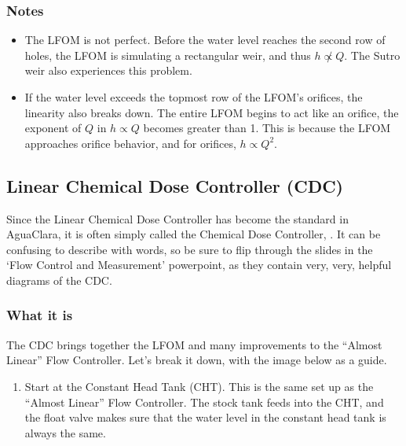 \documentclass[letterpaper,10pt,english]{sphinxmanual}
\begin{document}
\subsubsection{Notes}
\label{\detokenize{Flow_Control_and_Measurement/FCM_Design:id4}}\begin{itemize}
\item {} 
The LFOM is not perfect. Before the water level reaches the second row of holes, the LFOM is simulating a rectangular weir, and thus \(h \not\propto Q\). The Sutro weir also experiences this problem.

\item {} 
If the water level exceeds the topmost row of the LFOM’s orifices, the linearity also breaks down. The entire LFOM begins to act like an orifice, the exponent of \(Q\) in \(h \propto Q\) becomes greater than 1. This is because the LFOM approaches orifice behavior, and for orifices, \(h \propto Q^2\).

\end{itemize}


\subsection{Linear Chemical Dose Controller (CDC)}
\label{\detokenize{Flow_Control_and_Measurement/FCM_Design:linear-chemical-dose-controller-cdc}}\label{\detokenize{Flow_Control_and_Measurement/FCM_Design:heading-linear-cdc}}
Since the Linear Chemical Dose Controller has become the standard in AguaClara, it is often simply called the Chemical Dose Controller, . It can be confusing to describe with words, so be sure to flip through the slides in the ‘Flow Control and Measurement’ powerpoint, as they contain very, very, helpful diagrams of the CDC.


\subsubsection{What it is}
\label{\detokenize{Flow_Control_and_Measurement/FCM_Design:id5}}
The CDC brings together the LFOM and many improvements to the “Almost Linear” Flow Controller. Let’s break it down, with the image below as a guide.
\begin{enumerate}
\item {} 
Start at the Constant Head Tank (CHT). This is the same set up as the “Almost Linear” Flow Controller. The stock tank feeds into the CHT, and the float valve makes sure that the water level in the constant head tank is always the same.

\end{enumerate}
\end{document}
